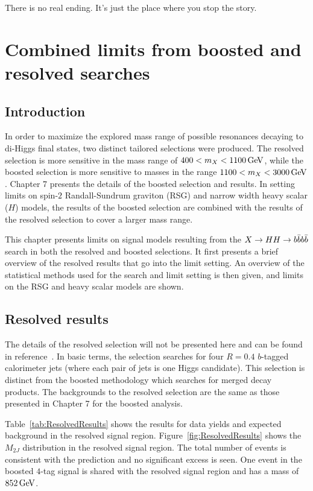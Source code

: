 \begin{savequote}[75mm]
There is no real ending. It’s just the place where you stop the story. 
\end{savequote}

\chapter{Combined limits from boosted and resolved searches}
\label{chap:4bcomb}

\section{Introduction}

In order to maximize the explored mass range of possible resonances decaying to di-Higgs final states, two distinct tailored selections were produced. The resolved selection is more sensitive in the mass range of $400 < m_{X} < 1100 \GeV$, while the boosted selection is more sensitive to masses in the range $1100 < m_{X} < 3000 \GeV$. Chapter 7 presents the details of the boosted selection and results. In setting limits on spin-$2$ Randall-Sundrum graviton (RSG) and narrow width heavy scalar ($H$) models, the results of the boosted selection are combined with the results of the resolved selection to cover a larger mass range.

This chapter presents limits on signal models resulting from the $X\to HH \to b\bar{b}b\bar{b}$ search in both the resolved and boosted selections. It first presents a brief overview of the resolved results that go into the limit setting. An overview of the statistical methods used for the search and limit setting is then given, and limits on the RSG and heavy scalar models are shown. 

\section{Resolved results}

The details of the resolved selection will not be presented here and can be found in reference~\cite{4bconf}. In basic terms, the selection searches for four $R = 0.4$ $b$-tagged calorimeter jets (where each pair of jets is one Higgs candidate). This selection is distinct from the boosted methodology which searches for merged decay products. The backgrounds to the resolved selection are the same as those presented in Chapter 7 for the boosted analysis. 

Table~\ref{tab:ResolvedResults} shows the results for data yields and expected background in the resolved signal region. Figure~\ref{fig:ResolvedResults} shows the $M_{2J}$ distribution in the resolved signal region. The total number of events is consistent with the prediction and no significant excess is seen. One event in the boosted $4$-tag signal is shared with the resolved signal region and has a mass of $852 \GeV$. 

